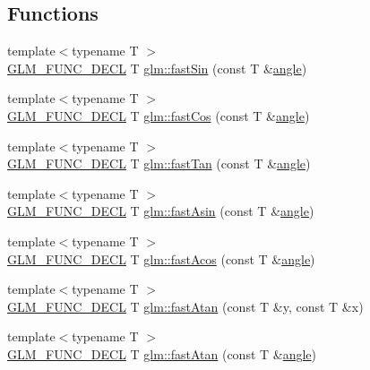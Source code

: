 \subsection*{Functions}
\begin{DoxyCompactItemize}
\item 
{\footnotesize template$<$typename T $>$ }\\\hyperlink{setup_8hpp_ab2d052de21a70539923e9bcbf6e83a51}{G\+L\+M\+\_\+\+F\+U\+N\+C\+\_\+\+D\+E\+CL} T \hyperlink{group__gtx__fast__trigonometry_ga01b7dc431bf5f5e6acce7d6bba311f86}{glm\+::fast\+Sin} (const T \&\hyperlink{group__gtc__quaternion_ga23a3fc7ada5bbb665ff84c92c6e0542c}{angle})
\item 
{\footnotesize template$<$typename T $>$ }\\\hyperlink{setup_8hpp_ab2d052de21a70539923e9bcbf6e83a51}{G\+L\+M\+\_\+\+F\+U\+N\+C\+\_\+\+D\+E\+CL} T \hyperlink{group__gtx__fast__trigonometry_gad54184beaba79e41db71a1f5711380c4}{glm\+::fast\+Cos} (const T \&\hyperlink{group__gtc__quaternion_ga23a3fc7ada5bbb665ff84c92c6e0542c}{angle})
\item 
{\footnotesize template$<$typename T $>$ }\\\hyperlink{setup_8hpp_ab2d052de21a70539923e9bcbf6e83a51}{G\+L\+M\+\_\+\+F\+U\+N\+C\+\_\+\+D\+E\+CL} T \hyperlink{group__gtx__fast__trigonometry_gae6615cdb40d8dc58115a07a21f495561}{glm\+::fast\+Tan} (const T \&\hyperlink{group__gtc__quaternion_ga23a3fc7ada5bbb665ff84c92c6e0542c}{angle})
\item 
{\footnotesize template$<$typename T $>$ }\\\hyperlink{setup_8hpp_ab2d052de21a70539923e9bcbf6e83a51}{G\+L\+M\+\_\+\+F\+U\+N\+C\+\_\+\+D\+E\+CL} T \hyperlink{group__gtx__fast__trigonometry_gab8595a77c5b215b95f662238dc3ff722}{glm\+::fast\+Asin} (const T \&\hyperlink{group__gtc__quaternion_ga23a3fc7ada5bbb665ff84c92c6e0542c}{angle})
\item 
{\footnotesize template$<$typename T $>$ }\\\hyperlink{setup_8hpp_ab2d052de21a70539923e9bcbf6e83a51}{G\+L\+M\+\_\+\+F\+U\+N\+C\+\_\+\+D\+E\+CL} T \hyperlink{group__gtx__fast__trigonometry_ga44e6efc3e776a51645fdf998e3e4f11b}{glm\+::fast\+Acos} (const T \&\hyperlink{group__gtc__quaternion_ga23a3fc7ada5bbb665ff84c92c6e0542c}{angle})
\item 
{\footnotesize template$<$typename T $>$ }\\\hyperlink{setup_8hpp_ab2d052de21a70539923e9bcbf6e83a51}{G\+L\+M\+\_\+\+F\+U\+N\+C\+\_\+\+D\+E\+CL} T \hyperlink{group__gtx__fast__trigonometry_gaf6234384b94846e29cf2c51dc245d484}{glm\+::fast\+Atan} (const T \&y, const T \&x)
\item 
{\footnotesize template$<$typename T $>$ }\\\hyperlink{setup_8hpp_ab2d052de21a70539923e9bcbf6e83a51}{G\+L\+M\+\_\+\+F\+U\+N\+C\+\_\+\+D\+E\+CL} T \hyperlink{group__gtx__fast__trigonometry_ga49b3b2b777b83eeed3e11205e800027e}{glm\+::fast\+Atan} (const T \&\hyperlink{group__gtc__quaternion_ga23a3fc7ada5bbb665ff84c92c6e0542c}{angle})
\end{DoxyCompactItemize}


